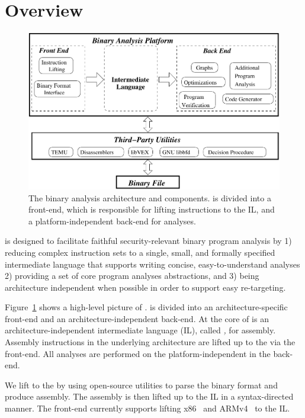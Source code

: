 \section{\bap Overview}

\begin{figure}
\centering
\includegraphics[scale=.8]{fig/components}
\caption{The \bap binary analysis architecture and components. \bap
  is divided into a front-end, which is responsible for lifting
  instructions to the \bap IL, and a platform-independent back-end
  for analyses.}
\label{fig:vine-components}
\end{figure}

\bap  is designed to facilitate faithful
security-relevant binary program analysis by 1) reducing complex
instruction sets to a single, small, and formally specified
intermediate language that supports writing  concise,
easy-to-understand analyses 2) providing a set of core program analyses
abstractions, and 3) being architecture independent when possible in
order to support easy re-targeting.


Figure~\ref{fig:vine-components} shows a high-level picture of \bap.
\bap is divided into an architecture-specific front-end and an
architecture-independent back-end.  At the core of \bap is an
architecture-independent intermediate language (IL), called \emph{\bil,} for
assembly. Assembly instructions in the underlying architecture are
lifted up to the \bil via the \bap front-end.  All analyses are
performed on the platform-independent \bil in the back-end.

We lift to the \bil by using open-source utilities to parse the binary
format and produce assembly.  The assembly is then lifted up to the
\bap IL in a syntax-directed manner. The \bap front-end currently
supports lifting x86~\cite{intel:x86} and ARMv4~\cite{arm:armv4} to
the IL.

